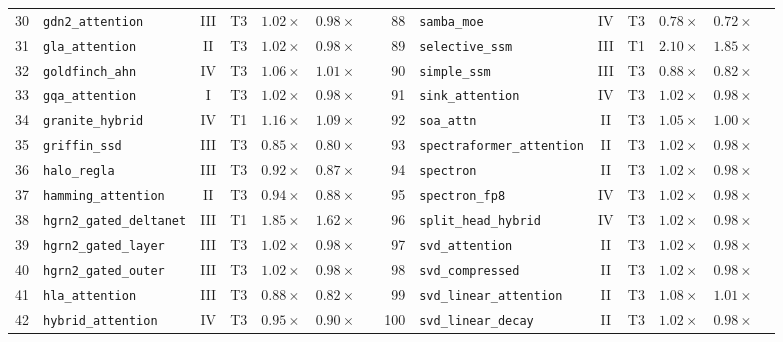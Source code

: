 \begin{table}[p]
{\begin{tabular}{r l c c c c l | r l c c c c l}
30 & \texttt{gdn2\_attention} & III & T3 & $1.02\times$ & $0.98\times$ & \passslow{} & 88 & \texttt{samba\_moe} & IV & T3 & $0.78\times$ & $0.72\times$ & \passslow{} \\
31 & \texttt{gla\_attention} & II & T3 & $1.02\times$ & $0.98\times$ & \passslow{} & 89 & \texttt{selective\_ssm} & III & T1 & $2.10\times$ & $1.85\times$ & \passfast{} \\
32 & \texttt{goldfinch\_ahn} & IV & T3 & $1.06\times$ & $1.01\times$ & \passfast{} & 90 & \texttt{simple\_ssm} & III & T3 & $0.88\times$ & $0.82\times$ & \passslow{} \\
33 & \texttt{gqa\_attention} & I & T3 & $1.02\times$ & $0.98\times$ & \passslow{} & 91 & \texttt{sink\_attention} & IV & T3 & $1.02\times$ & $0.98\times$ & \passslow{} \\
34 & \texttt{granite\_hybrid} & IV & T1 & $1.16\times$ & $1.09\times$ & \passfast{} & 92 & \texttt{soa\_attn} & II & T3 & $1.05\times$ & $1.00\times$ & \passfast{} \\
35 & \texttt{griffin\_ssd} & III & T3 & $0.85\times$ & $0.80\times$ & \passslow{} & 93 & \texttt{spectraformer\_attention} & II & T3 & $1.02\times$ & $0.98\times$ & \passslow{} \\
36 & \texttt{halo\_regla} & III & T3 & $0.92\times$ & $0.87\times$ & \passslow{} & 94 & \texttt{spectron} & II & T3 & $1.02\times$ & $0.98\times$ & \passslow{} \\
37 & \texttt{hamming\_attention} & II & T3 & $0.94\times$ & $0.88\times$ & \passslow{} & 95 & \texttt{spectron\_fp8} & IV & T3 & $1.02\times$ & $0.98\times$ & \passslow{} \\
38 & \texttt{hgrn2\_gated\_deltanet} & III & T1 & $1.85\times$ & $1.62\times$ & \passfast{} & 96 & \texttt{split\_head\_hybrid} & IV & T3 & $1.02\times$ & $0.98\times$ & \passslow{} \\
39 & \texttt{hgrn2\_gated\_layer} & III & T3 & $1.02\times$ & $0.98\times$ & \passslow{} & 97 & \texttt{svd\_attention} & II & T3 & $1.02\times$ & $0.98\times$ & \passslow{} \\
40 & \texttt{hgrn2\_gated\_outer} & III & T3 & $1.02\times$ & $0.98\times$ & \passslow{} & 98 & \texttt{svd\_compressed} & II & T3 & $1.02\times$ & $0.98\times$ & \passslow{} \\
41 & \texttt{hla\_attention} & III & T3 & $0.88\times$ & $0.82\times$ & \passslow{} & 99 & \texttt{svd\_linear\_attention} & II & T3 & $1.08\times$ & $1.01\times$ & \passfast{} \\
42 & \texttt{hybrid\_attention} & IV & T3 & $0.95\times$ & $0.90\times$ & \passslow{} & 100 & \texttt{svd\_linear\_decay} & II & T3 & $1.02\times$ & $0.98\times$ & \passslow{} \\

\end{tabular}}
\end{table}
